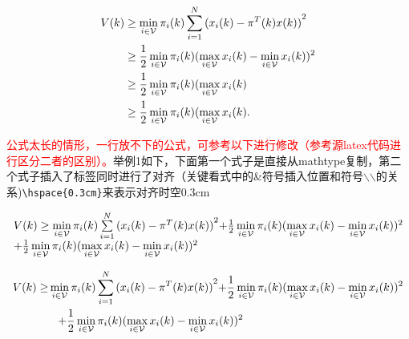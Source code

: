 \begin{equation}\label{system2}
\begin{split}
V(k) &\ge \mathop {\min }\limits_{i \in {\cal V}} {\pi _i}(k)\sum\limits_{i = 1}^N {{{({x_i}(k) - {\pi ^T}(k)x(k))}^2}} \\
 &\ge \frac{1}{2}\mathop {\min }\limits_{i \in {\cal V}} {\pi _i}(k){(\mathop {\max }\limits_{i \in {\cal V}} {x_i}(k) - \mathop {\min }\limits_{i \in {\cal V}} {x_i}(k))^2}\\
 &\ge \frac{1}{2}\mathop {\min }\limits_{i \in {\cal V}} {\pi _i}(k)(\mathop {\max }\limits_{i \in {\cal V}} {x_i}(k)\\
 &\ge \frac{1}{2}\mathop {\min }\limits_{i \in {\cal V}} {\pi _i}(k)(\mathop {\max }\limits_{i \in {\cal V}} {x_i}(k).
\end{split}
\end{equation}

\textcolor{red}{公式太长的情形，一行放不下的公式，可参考以下进行修改（参考源latex代码进行区分二者的区别）。}举例1如下，下面第一个式子是直接从mathtype复制，第二个式子插入了标签同时进行了对齐（关键看式中的\&符号插入位置和符号$\backslash$$\backslash$的关系)\verb+\hspace{0.3cm}+来表示对齐时空0.3cm


\[\begin{array}{l}
V(k) \ge \mathop {\min }\limits_{i \in {\cal V}} {\pi _i}(k)\sum\limits_{i = 1}^N {{{({x_i}(k) - {\pi ^T}(k)x(k))}^2}} {\rm{ + }}\frac{1}{2}\mathop {\min }\limits_{i \in {\cal V}} {\pi _i}(k){(\mathop {\max }\limits_{i \in {\cal V}} {x_i}(k) - \mathop {\min }\limits_{i \in {\cal V}} {x_i}(k))^2}\\
{\rm{ + }}\frac{1}{2}\mathop {\min }\limits_{i \in {\cal V}} {\pi _i}(k){(\mathop {\max }\limits_{i \in {\cal V}} {x_i}(k) - \mathop {\min }\limits_{i \in {\cal V}} {x_i}(k))^2}
\end{array}\]

\begin{equation}\label{system3}
  \begin{split}
V(k) \ge& \mathop {\min }\limits_{i \in {\cal V}} {\pi _i}(k)\sum\limits_{i = 1}^N {{{({x_i}(k) - {\pi ^T}(k)x(k))}^2}} {\rm{ + }}\frac{1}{2}\mathop {\min }\limits_{i \in {\cal V}} {\pi _i}(k){(\mathop {\max }\limits_{i \in {\cal V}} {x_i}(k) - \mathop {\min }\limits_{i \in {\cal V}} {x_i}(k))^2}\\
&\hspace{0.3cm}{\rm{ + }}\frac{1}{2}\mathop {\min }\limits_{i \in {\cal V}} {\pi _i}(k){(\mathop {\max }\limits_{i \in {\cal V}} {x_i}(k) - \mathop {\min }\limits_{i \in {\cal V}} {x_i}(k))^2}
  \end{split}
\end{equation}

